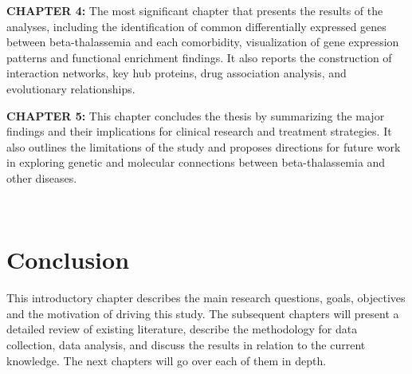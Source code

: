 \vspace{0.2cm}

\textbf{CHAPTER 4:}
The most significant chapter that presents the results of the analyses, including the identification of common differentially expressed genes between beta-thalassemia and each comorbidity, visualization of gene expression patterns and functional enrichment findings. It also reports the construction of interaction networks, key hub proteins, drug association analysis, and evolutionary relationships.

\vspace{0.2cm}

\textbf{CHAPTER 5:} 
This chapter concludes the thesis by summarizing the major findings and their implications for clinical research and treatment strategies. It also outlines the limitations of the study and proposes directions for future work in exploring genetic and molecular connections between beta-thalassemia and other diseases.

\vspace{0.2cm}

\
\section{Conclusion}
\label{sec:sec1_5}

\space This introductory chapter describes the main research questions, goals, objectives and the motivation of driving this study. The subsequent chapters will present a detailed review of existing literature, describe the methodology for data collection, data analysis, and discuss the results in relation to the current knowledge. The next chapters will go over each of them in depth.
